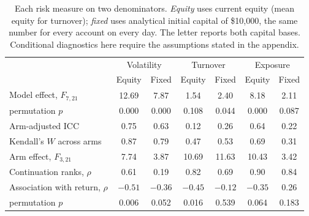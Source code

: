 \begin{table}[ht]
\centering
\footnotesize
\caption{Each risk measure on two denominators. \emph{Equity} uses current equity (mean equity for turnover); \emph{fixed} uses analytical initial capital of \$10{,}000, the same number for every account on every day. The letter reports both capital bases. Conditional diagnostics here require the assumptions stated in the appendix.}
\label{tab:voldenom}
\begin{tabular}{lcccccc}
\toprule
 & \multicolumn{2}{c}{Volatility} & \multicolumn{2}{c}{Turnover} & \multicolumn{2}{c}{Exposure} \\
\cmidrule(lr){2-3}\cmidrule(lr){4-5}\cmidrule(lr){6-7}
 & Equity & Fixed & Equity & Fixed & Equity & Fixed \\
\midrule
Model effect, $F_{7,21}$ & 12.69 & 7.87 & 1.54 & 2.40 & 8.18 & 2.11 \\
\quad permutation $p$ & 0.000 & 0.000 & 0.108 & 0.044 & 0.000 & 0.087 \\
Arm-adjusted ICC & 0.75 & 0.63 & 0.12 & 0.26 & 0.64 & 0.22 \\
Kendall's $W$ across arms & 0.87 & 0.79 & 0.47 & 0.53 & 0.69 & 0.31 \\
Arm effect, $F_{3,21}$ & 7.74 & 3.87 & 10.69 & 11.63 & 10.43 & 3.42 \\
Continuation ranks, $\rho$ & 0.61 & 0.19 & 0.82 & 0.69 & 0.90 & 0.84 \\
Association with return, $\rho$ & $-0.51$ & $-0.36$ & $-0.45$ & $-0.12$ & $-0.35$ & 0.26 \\
\quad permutation $p$ & 0.006 & 0.052 & 0.016 & 0.539 & 0.064 & 0.183 \\
\bottomrule
\end{tabular}
\end{table}
